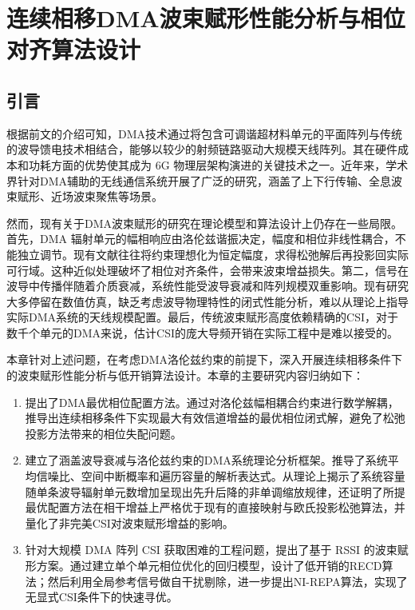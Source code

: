 \chapter{连续相移DMA波束赋形性能分析与相位对齐算法设计}\label{ch:cdma}

\section{引言}\label{sec:cdma_intro}

根据前文的介绍可知，DMA技术通过将包含可调谐超材料单元的平面阵列与传统的波导馈电技术相结合，能够以较少的射频链路驱动大规模天线阵列。其在硬件成本和功耗方面的优势使其成为 6G 物理层架构演进的关键技术之一。近年来，学术界针对DMA辅助的无线通信系统开展了广泛的研究，涵盖了上下行传输\cite{jiang2022hybrid}、全息波束赋形\cite{altinoklu2025investigation}、近场波束聚焦\cite{gavriilidis2025near}等场景。

然而，现有关于DMA波束赋形的研究在理论模型和算法设计上仍存在一些局限。
首先，DMA 辐射单元的幅相响应由洛伦兹谐振决定，幅度和相位非线性耦合，不能独立调节。现有文献往往将约束理想化为恒定幅度，求得松弛解后再投影回实际可行域。这种近似处理破坏了相位对齐条件，会带来波束增益损失。第二，信号在波导中传播伴随着介质衰减，系统性能受波导衰减和阵列规模双重影响。现有研究大多停留在数值仿真，缺乏考虑波导物理特性的闭式性能分析，难以从理论上指导实际DMA系统的天线规模配置。最后，传统波束赋形高度依赖精确的CSI，对于数千个单元的DMA来说，估计CSI的庞大导频开销在实际工程中是难以接受的。

本章针对上述问题，在考虑DMA洛伦兹约束的前提下，深入开展连续相移条件下的波束赋形性能分析与低开销算法设计。本章的主要研究内容归纳如下：

\begin{enumerate}
	\item 提出了DMA最优相位配置方法。通过对洛伦兹幅相耦合约束进行数学解耦，推导出连续相移条件下实现最大有效信道增益的最优相位闭式解，避免了松弛投影方法带来的相位失配问题。
	
	\item 建立了涵盖波导衰减与洛伦兹约束的DMA系统理论分析框架。推导了系统平均信噪比、空间中断概率和遍历容量的解析表达式。从理论上揭示了系统容量随单条波导辐射单元数增加呈现出先升后降的非单调缩放规律，还证明了所提最优配置方法在相干增益上严格优于现有的直接映射与欧氏投影松弛算法，并量化了非完美CSI对波束赋形增益的影响。
	
	\item 针对大规模 DMA 阵列 CSI 获取困难的工程问题，提出了基于 RSSI 的波束赋形方案。通过建立单个单元相位优化的回归模型，设计了低开销的RECD算法；然后利用全局参考信号做自干扰剔除，进一步提出NI-REPA算法，实现了无显式CSI条件下的快速寻优。
\end{enumerate}

